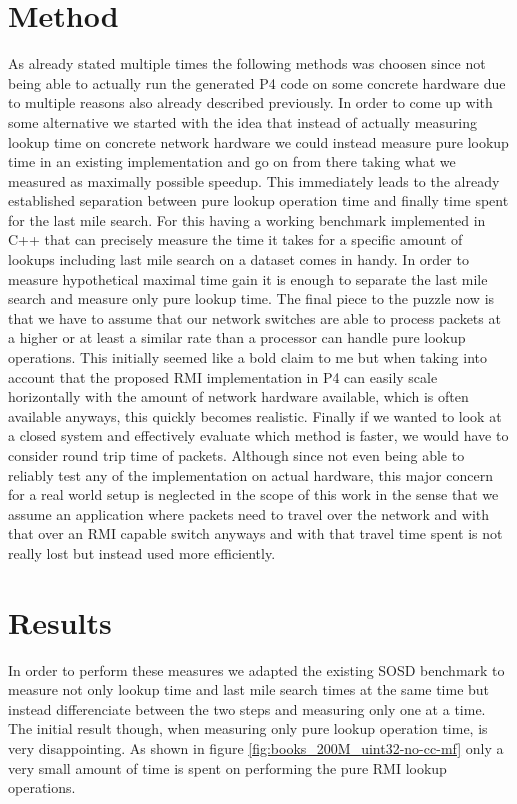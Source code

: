 \section{Method}
As already stated multiple times the following methods was choosen since not being able to actually run the generated P4 code on some concrete hardware due to multiple reasons also already described previously. In order to come up with some alternative we started with the idea that instead of actually measuring lookup time on concrete network hardware we could instead measure pure lookup time in an existing implementation and go on from there taking what we measured as maximally possible speedup. This immediately leads to the already established separation between pure lookup operation time and finally time spent for the last mile search. For this having a working benchmark implemented in C++ that can precisely measure the time it takes for a specific amount of lookups including last mile search on a dataset comes in handy. In order to measure hypothetical maximal time gain it is enough to separate the last mile search and measure only pure lookup time. The final piece to the puzzle now is that we have to assume that our network switches are able to process packets at a higher or at least a similar rate than a processor can handle pure lookup operations. This initially seemed like a bold claim to me but when taking into account that the proposed RMI implementation in P4 can easily scale horizontally with the amount of network hardware available, which is often available anyways, this quickly becomes realistic. Finally if we wanted to look at a closed system and effectively evaluate which method is faster, we would have to consider round trip time of packets. Although since not even being able to reliably test any of the implementation on actual hardware, this major concern for a real world setup is neglected in the scope of this work in the sense that we assume an application where packets need to travel over the network and with that over an RMI capable switch anyways and with that travel time spent is not really lost but instead used more efficiently.

\section{Results}
\label{sect:measurements:results}
In order to perform these measures we adapted the existing SOSD benchmark to measure not only lookup time and last mile search times at the same time but instead differenciate between the two steps and measuring only one at a time. The initial result though, when measuring only pure lookup operation time, is very disappointing. As shown in figure \ref{fig:books_200M_uint32-no-cc-mf} only a very small amount of time is spent on performing the pure RMI lookup operations.

